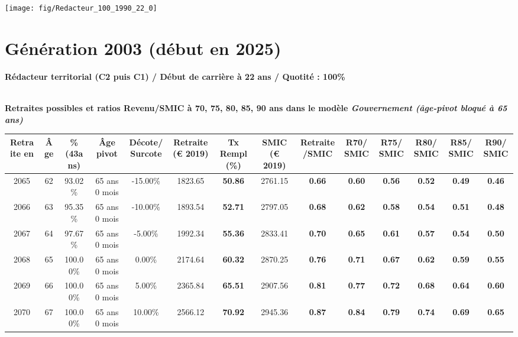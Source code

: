  {\hspace{-2.2cm}\texttt{[image: fig/Redacteur\_100\_1990\_22\_0]}} 

\newpage 
 
\section{Génération 2003 (début en 2025)\label{Redacteur_100_2003_22_0}} 
 
{\bf \noindent Rédacteur territorial (C2 puis C1) / Début de carrière à 22 ans / Quotité : 100\%}  ~ 

 ~\\{\bf \noindent Retraites possibles et ratios Revenu/SMIC à 70, 75, 80, 85, 90 ans dans le modèle \emph{Gouvernement (âge-pivot bloqué à 65 ans)}}  
 
\begin{adjustbox}{max width=\textwidth} 
\begin{tabular}[htb]{|c|c||c|c|c||c|c||c|c||c|c|c|c|c|} 
\hline 
 Retraite en &  Âge &  \%(43ans) &  Âge pivot &  Décote/Surcote &  Retraite (\euro{} 2019) &  Tx Rempl(\%) &  SMIC (\euro{} 2019) &  Retraite/SMIC &  R70/SMIC &  R75/SMIC &  R80/SMIC &  R85/SMIC &  R90/SMIC \\ 
\hline \hline 
 2065 &  62 &  93.02\% &  65 ans 0 mois &  -15.00\% &  1823.65 &  {\bf 50.86} &  2761.15 &  {\bf {\color{red} 0.66}} &  {\bf {\color{red} 0.60}} &  {\bf {\color{red} 0.56}} &  {\bf {\color{red} 0.52}} &  {\bf {\color{red} 0.49}} &  {\bf {\color{red} 0.46}} \\ 
\hline 
 2066 &  63 &  95.35\% &  65 ans 0 mois &  -10.00\% &  1893.54 &  {\bf 52.71} &  2797.05 &  {\bf {\color{red} 0.68}} &  {\bf {\color{red} 0.62}} &  {\bf {\color{red} 0.58}} &  {\bf {\color{red} 0.54}} &  {\bf {\color{red} 0.51}} &  {\bf {\color{red} 0.48}} \\ 
\hline 
 2067 &  64 &  97.67\% &  65 ans 0 mois &  -5.00\% &  1992.34 &  {\bf 55.36} &  2833.41 &  {\bf {\color{red} 0.70}} &  {\bf {\color{red} 0.65}} &  {\bf {\color{red} 0.61}} &  {\bf {\color{red} 0.57}} &  {\bf {\color{red} 0.54}} &  {\bf {\color{red} 0.50}} \\ 
\hline 
 2068 &  65 &  100.00\% &  65 ans 0 mois &  0.00\% &  2174.64 &  {\bf 60.32} &  2870.25 &  {\bf {\color{red} 0.76}} &  {\bf {\color{red} 0.71}} &  {\bf {\color{red} 0.67}} &  {\bf {\color{red} 0.62}} &  {\bf {\color{red} 0.59}} &  {\bf {\color{red} 0.55}} \\ 
\hline 
 2069 &  66 &  100.00\% &  65 ans 0 mois &  5.00\% &  2365.84 &  {\bf 65.51} &  2907.56 &  {\bf {\color{red} 0.81}} &  {\bf {\color{red} 0.77}} &  {\bf {\color{red} 0.72}} &  {\bf {\color{red} 0.68}} &  {\bf {\color{red} 0.64}} &  {\bf {\color{red} 0.60}} \\ 
\hline 
 2070 &  67 &  100.00\% &  65 ans 0 mois &  10.00\% &  2566.12 &  {\bf 70.92} &  2945.36 &  {\bf {\color{red} 0.87}} &  {\bf {\color{red} 0.84}} &  {\bf {\color{red} 0.79}} &  {\bf {\color{red} 0.74}} &  {\bf {\color{red} 0.69}} &  {\bf {\color{red} 0.65}} \\ 
\hline 
\hline 
\end{tabular} 
\end{adjustbox} 
 
